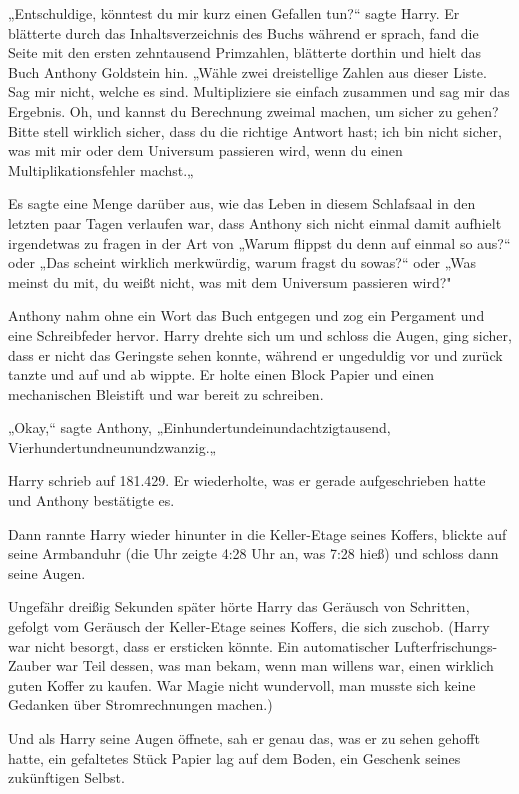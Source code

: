 {„Entschuldige, könntest du mir kurz einen Gefallen tun?“ sagte Harry. Er blätterte durch das Inhaltsverzeichnis des Buchs während er sprach, fand die Seite mit den ersten zehntausend Primzahlen, blätterte dorthin und hielt das Buch Anthony Goldstein hin. „Wähle zwei dreistellige Zahlen aus dieser Liste. Sag mir nicht, welche es sind. Multipliziere sie einfach zusammen und sag mir das Ergebnis. Oh, und kannst du Berechnung zweimal machen, um sicher zu gehen? Bitte stell wirklich sicher, dass du die richtige Antwort hast; ich bin nicht sicher, was mit mir oder dem Universum passieren wird, wenn du einen Multiplikationsfehler machst.„

Es sagte eine Menge darüber aus, wie das Leben in diesem Schlafsaal in den letzten paar Tagen verlaufen war, dass Anthony sich nicht einmal damit aufhielt irgendetwas zu fragen in der Art von „Warum flippst du denn auf einmal so aus?“ oder „Das scheint wirklich merkwürdig, warum fragst du sowas?“ oder „Was meinst du mit, du weißt nicht, was mit dem Universum passieren wird?"

Anthony nahm ohne ein Wort das Buch entgegen und zog ein Pergament und eine Schreibfeder hervor. Harry drehte sich um und schloss die Augen, ging sicher, dass er nicht das Geringste sehen konnte, während er ungeduldig vor und zurück tanzte und auf und ab wippte. Er holte einen Block Papier und einen mechanischen Bleistift und war bereit zu schreiben.

„Okay,“ sagte Anthony, „Einhundertundeinundachtzigtausend, Vierhundertundneunundzwanzig.„

Harry schrieb auf 181.429. Er wiederholte, was er gerade aufgeschrieben hatte und Anthony bestätigte es.

Dann rannte Harry wieder hinunter in die Keller-Etage seines Koffers, blickte auf seine Armbanduhr (die Uhr zeigte 4:28 Uhr an, was 7:28 hieß) und schloss dann seine Augen.

Ungefähr dreißig Sekunden später hörte Harry das Geräusch von Schritten, gefolgt vom Geräusch der Keller-Etage seines Koffers, die sich zuschob. (Harry war nicht besorgt, dass er ersticken könnte. Ein automatischer Lufterfrischungs-Zauber war Teil dessen, was man bekam, wenn man willens war, einen wirklich guten Koffer zu kaufen. War Magie nicht wundervoll, man musste sich keine Gedanken über Stromrechnungen machen.)

Und als Harry seine Augen öffnete, sah er genau das, was er zu sehen gehofft hatte, ein gefaltetes Stück Papier lag auf dem Boden, ein Geschenk seines zukünftigen Selbst.

}
